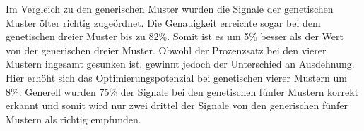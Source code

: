 Im Vergleich zu den generischen Muster wurden die Signale der genetischen Muster {\"o}fter richtig zuge{\"o}rdnet. 
Die Genauigkeit erreichte sogar bei dem genetischen dreier Muster bis zu 82\%. 
Somit ist es um 5\% besser als der Wert von der generischen dreier Muster.
Obwohl der Prozenzsatz bei den vierer Mustern ingesamt gesunken ist, gewinnt jedoch der Unterschied an Ausdehnung.
Hier erh{\"o}ht sich das Optimierungspotenzial bei genetischen vierer Mustern um 8\%.
Generell wurden 75\% der Signale bei den genetischen f{\"u}nfer Mustern korrekt erkannt und somit wird nur zwei drittel der Signale von den generischen f{\"u}nfer Mustern als richtig empfunden.





